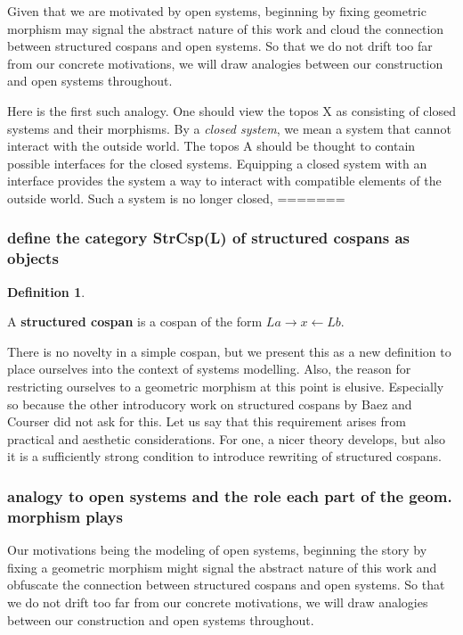 \documentclass{amsart}
\newcommand{\A}{\cat{A}}
\newcommand{\X}{\cat{X}}
\newcommand{\defn}[1]{\textbf{#1}}
\newcommand{\cat}[1]{\mathrm{#1}}
\renewcommand{\gets}{\leftarrow}
\theoremstyle{remark}
\theoremstyle{definition}
\newtheorem{definition}[theorem]{Definition}
\begin{document}
Given that we are motivated by open systems, beginning by fixing
geometric morphism may signal the abstract nature of this work and
cloud the connection between structured cospans and open
systems. So that we do not drift too far from our concrete
motivations, we will draw analogies between our construction and open
systems throughout.

Here is the first such analogy. One should view the topos $ \X $ as
consisting of closed systems and their morphisms. By a \emph{closed
  system}, we mean a system that cannot interact with the outside
world. The topos $ \A $ should be thought to contain possible
interfaces for the closed systems. Equipping a closed system with an
interface provides the system a way to interact with
compatible elements of the outside world. Such a system is no longer closed,
=======
\subsubsection{define the category StrCsp(L) of structured cospans as objects}
\label{sec-2-2-1}

\begin{definition}\label{df:strcsp}

  A \defn{ structured cospan } is a cospan of the form
  $ La \to x \gets Lb $.
  
\end{definition}

There is no novelty in a simple cospan, but we present this as a new
definition to place ourselves into the context of systems
modelling. Also, the reason for restricting ourselves to a geometric
morphism at this point is elusive. Especially so because the other
introducory work on structured cospans by Baez and Courser did not ask
for this. Let us say that this requirement arises from practical and
aesthetic considerations. For one, a nicer theory develops, but also
it is a sufficiently strong condition to introduce rewriting of
structured cospans.

\subsubsection{analogy to open systems and the role each part of the geom. morphism plays}
\label{sec-2-2-2}

Our motivations being the modeling of open systems, beginning
the story by fixing a geometric morphism might signal the abstract
nature of this work and obfuscate the connection between structured
cospans and open systems. So that we do not drift too far from our
concrete motivations, we will draw analogies between our construction
and open systems throughout.  
\end{document}
